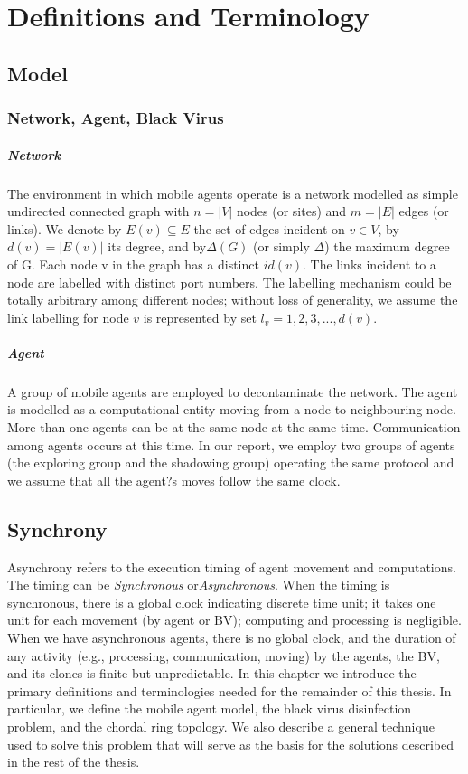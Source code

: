 \chapter {Definitions and Terminology}
\label{PM}
\section{Model}
\subsection{Network, Agent, Black Virus}
\paragraph{Network} The environment in which mobile agents operate is a network modelled as simple undirected connected graph with $n = \left |V\right |$ nodes (or sites) and $m = \left |E\right |$ edges (or links). We denote by $E (v)\subseteq E$ the set of edges incident on $v\in V$, by $d (v) = \left|E (v)\right|$ its degree, and by$\Delta(G)$ (or simply $\Delta$) the maximum degree of G. Each node v in the graph has a distinct $id(v)$. The links incident to a node are labelled with distinct port numbers. The labelling mechanism could be totally arbitrary among different nodes; without loss of generality, we assume the link labelling for node $v$ is represented by set $l_v =1,2,3,...,d(v)$.

\paragraph{Agent} A group of mobile agents are employed to decontaminate the network. The agent is modelled as a computational entity moving from a node to neighbouring node. More than one agents can be at the same node at the same time. Communication among agents occurs at this time. In our report, we employ two groups of agents (the exploring group and the shadowing group) operating the same protocol and we assume that all the agent?s moves follow the same clock. 

\section{Synchrony}
Asynchrony refers to the execution timing of agent movement and computations. The timing can be {\em Synchronous} or{\em Asynchronous}. When the timing is synchronous, there is a global clock indicating discrete time unit; it takes one unit for each movement (by agent or BV); computing and processing is negligible.
When we have asynchronous agents, there is no global clock, and the duration of any activity (e.g., processing, communication, moving) by the agents, the BV, and its clones is finite but unpredictable.
In this chapter we  introduce the primary definitions and terminologies needed for the remainder of this thesis.
In particular, we define the mobile agent model, the black virus  disinfection problem,  and the chordal ring topology. We also describe a general technique used to solve this problem that will serve as the basis for the solutions described in the rest of the thesis.

